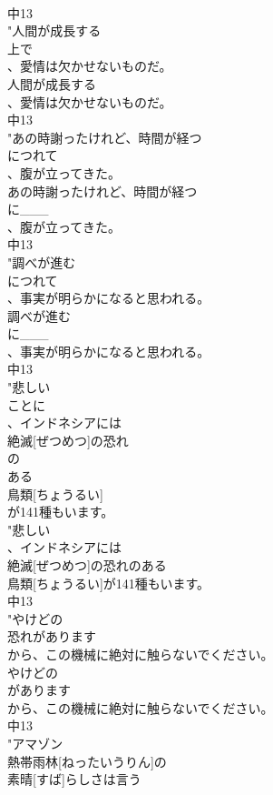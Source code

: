\documentclass[8pt]{extreport}
\begin{document}
\begin{CJK}{UTF8}{min}
\\	中13
\\	"人間が成長する
\\	上で
\\	、愛情は欠かせないものだ。
\\	人間が成長する
\\	、愛情は欠かせないものだ。
\\	中13
\\	"あの時謝ったけれど、時間が経つ
\\	につれて
\\	、腹が立ってきた。
\\	あの時謝ったけれど、時間が経つ
\\	に___
\\	、腹が立ってきた。
\\	中13
\\	"調べが進む
\\	につれて
\\	、事実が明らかになると思われる。
\\	調べが進む
\\	に___
\\	、事実が明らかになると思われる。
\\	中13
\\	"悲しい
\\	ことに
\\	、インドネシアには
\\	絶滅[ぜつめつ]の恐れ
\\	の
\\	ある
\\	鳥類[ちょうるい]
\\	が141種もいます。
\\	"悲しい
\\	、インドネシアには
\\	絶滅[ぜつめつ]の恐れのある
\\	鳥類[ちょうるい]が141種もいます。
\\	中13
\\	"やけどの
\\	恐れがあります
\\	から、この機械に絶対に触らないでください。
\\	やけどの
\\	があります
\\	から、この機械に絶対に触らないでください。
\\	中13
\\	"アマゾン
\\	熱帯雨林[ねったいうりん]の
\\	素晴[すば]らしさは言う

\end{CJK}
\end{document}
